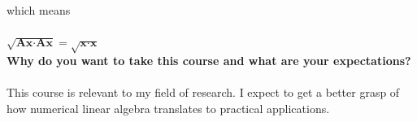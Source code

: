 \documentclass[12pt,letterpaper,fleqn]{article}
\theoremstyle{definition}
\begin{document}
which means\\
\\
$ \sqrt{\textbf{Ax}\cdot \textbf{Ax}} = \sqrt{\textbf{x} \cdot \textbf{x}}$\\
\newpage
\textbf{Why do you want to take this course and what are your expectations?}\\
\\
This course is relevant to my field of research. I expect to get a better grasp of how numerical linear algebra translates to practical applications.
\end{document}
